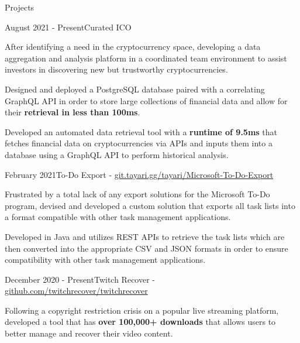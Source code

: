 \documentclass{article}
\newlength{\tabin}
\newlength{\secsep}
\newcommand{\lineunder}{\vspace*{-8pt} \\ \hspace*{-6pt} \hrulefill \\ \vspace*{-15pt}}
\newenvironment{tabbedsection}[1]{
  \begin{list}{}{
      \setlength{\itemsep}{0pt}
      \setlength{\labelsep}{0pt}
      \setlength{\labelwidth}{0pt}
      \setlength{\leftmargin}{0pt}
      \setlength{\rightmargin}{\tabin}
      \setlength{\listparindent}{0pt}
      \setlength{\parsep}{0pt}
      \setlength{\parskip}{0pt}
      \setlength{\partopsep}{0pt}
      \setlength{\topsep}{#1}
    }
  \item[]
}{\end{list}}
\newenvironment{resume_section}[1]{
  \filbreak
  \vspace{2\secsep}
  \textsc{\color{blue}\large#1}
  \lineunder
  \begin{tabbedsection}{\secsep}
}{\end{tabbedsection}}
\newenvironment{resume_subsection}[2]{
  \textbf{\color{BlueViolet}#2} \hfill {\normalsize (#1)} \hspace{-5em}
  \begin{tabbedsection}{0.5\secsep}
  \begin{subitems}
}{\end{subitems}\end{tabbedsection}}
\newenvironment{subitems}{
  \renewcommand{\labelitemi}{-}
  \begin{itemize}
      \setlength{\labelsep}{1em}
}{\end{itemize}}
\begin{document}
\vspace{2\secsep}

\begin{resume_section}{Projects}
    \begin{resume_subsection}{August 2021 - Present}{Curated ICO}
        \item After identifying a need in the cryptocurrency space, developing a data aggregation and analysis platform in a coordinated team environment to assist investors in discovering new but trustworthy cryptocurrencies.
        \item Designed and deployed a PostgreSQL database paired with a correlating GraphQL API in order to store large collections of financial data and allow for their \textbf{retrieval in less than 100ms}.
        \item Developed an automated data retrieval tool with a \textbf{runtime of 9.5ms} that fetches financial data on cryptocurrencies via APIs and inputs them into a database using a GraphQL API to perform historical analysis.
    \end{resume_subsection}
    \vspace{2\secsep}
    \begin{resume_subsection}{February 2021}{To-Do Export - \faGitlab \hspace{0.01cm} \href{https://git.tayari.gg/tayari/Microsoft-To-Do-Export}{git.tayari.gg/tayari/Microsoft-To-Do-Export}}
        \item Frustrated by a total lack of any export solutions for the Microsoft To-Do program, devised and developed a custom solution that exports all task lists into a format compatible with other task management applications.
        \item Developed in Java and utilizes REST APIs to retrieve the task lists which are then converted into the appropriate CSV and JSON formats in order to ensure compatibility with other task management applications.
    \end{resume_subsection}
    \vspace{2\secsep}
    \begin{resume_subsection}{December 2020 - Present}{Twitch Recover - \faGithub \hspace{0.01cm} \href{https://github.com/twitchrecover/twitchrecover}{github.com/twitchrecover/twitchrecover}}
        \item Following a copyright restriction crisis on a popular live streaming platform, developed a tool that has \textbf{over 100,000+ downloads} that allows users to better manage and recover their video content.

\end{resume_subsection}
\end{resume_section}
\end{document}
